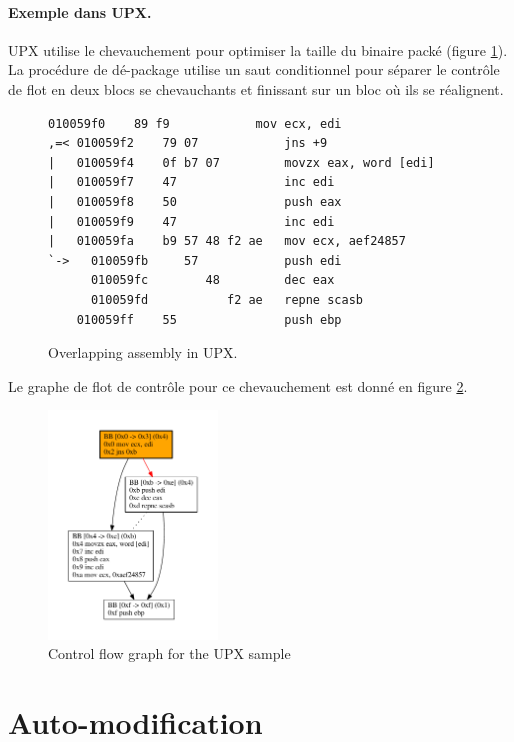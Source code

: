\paragraph{Exemple dans UPX.}
UPX utilise le chevauchement pour optimiser la taille du binaire packé (figure \ref{fig:upx_obf_asm}).
La procédure de dé-package utilise un saut conditionnel pour séparer le contrôle de flot en deux blocs se chevauchants et finissant sur un bloc où ils se réalignent.
\begin{figure}
\scriptsize
\begin{lstlisting}[language={[x86masm]Assembler}, escapechar=~]
    010059f0    89 f9            mov ecx, edi
,=< 010059f2    79 07            jns +9
|   010059f4    0f b7 07         movzx eax, word [edi]
|   010059f7    47               inc edi
|   010059f8    50               push eax
|   010059f9    47               inc edi
|   010059fa    b9 57 48 f2 ae   mov ecx, aef24857
`->   010059fb     57            push edi
      010059fc        48         dec eax
      010059fd           f2 ae   repne scasb
    010059ff    55               push ebp
\end{lstlisting}
\caption{Overlapping assembly in UPX.\label{fig:upx_obf_asm}}
\end{figure}
Le graphe de flot de contrôle pour ce chevauchement est donné en figure \ref{fig:upx_cfg}.

\begin{figure}
\begin{center}
\includegraphics[width=0.4\textwidth]{supports/disasm/upx/upx.pdf}
\end{center}
\caption{Control flow graph for the UPX sample}
\label{fig:upx_cfg}
\end{figure}
\section{Auto-modification}

